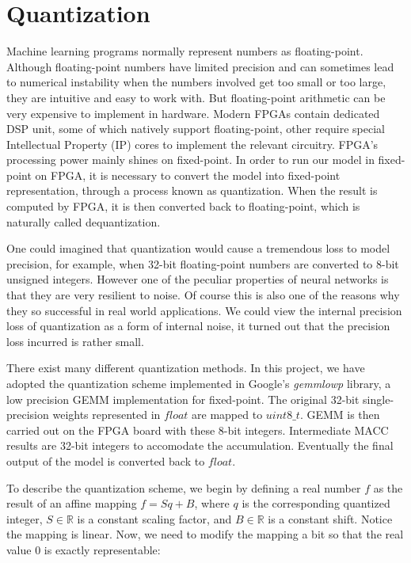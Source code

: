 
\chapter{Quantization}

Machine learning programs normally represent numbers as floating-point. Although floating-point numbers
have limited precision and can sometimes lead to numerical instability when the numbers involved get too
small or too large, they are intuitive and easy to work with. But floating-point arithmetic can be very
expensive to implement in hardware. Modern FPGAs contain dedicated DSP unit, some of which natively
support floating-point, other require special Intellectual Property (IP) cores to implement the relevant
circuitry. FPGA's processing power mainly shines on fixed-point. In order to run our model in fixed-point
on FPGA, it is necessary to convert the model into fixed-point representation, through a process known as
quantization. When the result is computed by FPGA, it is then converted back to floating-point, which is
naturally called dequantization.

One could imagined that quantization would cause a tremendous loss to model precision, for example, when
32-bit floating-point numbers are converted to 8-bit unsigned integers. However one of the peculiar
properties of neural networks is that they are very resilient to noise. Of course this is also one of the
reasons why they so successful in real world applications. We could view the internal precision loss of
quantization as a form of internal noise, it turned out that the precision loss incurred is rather small.

There exist many different quantization methods. In this project, we have adopted the quantization scheme
implemented in Google's \textit{gemmlowp} library, a low precision GEMM implementation for fixed-point. The
original 32-bit single-precision weights represented in $float$ are mapped to $uint8\_t$. GEMM is then
carried out on the FPGA board with these 8-bit integers. Intermediate MACC results are 32-bit
integers to accomodate the accumulation. Eventually the final output of the model is converted back to $float$.

To describe the quantization scheme, we begin by defining a real number $f$ as the result of an affine
mapping $f = S q + B$, where $q$ is the corresponding quantized integer, $S \in \mathbb{R}$ is a constant
scaling factor, and $B \in \mathbb{R}$ is a constant shift. Notice the mapping is linear. Now, we need to
modify the mapping a bit so that the real value $0$ is exactly representable:


